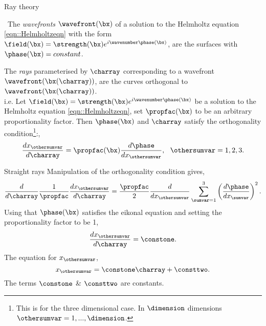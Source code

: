 \documentclass[8pt]{beamer}
\begin{document}
\begin{frame}{Ray theory}
\begin{minipage}{0.5\linewidth}
\begin{defn}[Wavefront]\label{defn::wavefront} \
The \textit{wavefronts $\wavefront(\bx)$} of a solution to the Helmholtz equation \eqref{eqn::Helmholtzeqn} with the form $\field (\bx) = \strength (\bx) e^{i \wavenumber \phase (\bx) }$, are the surfaces with 
$\phase(\bx)=constant$.
\end{defn}
\end{minipage}
\begin{minipage}{0.05\linewidth}
\mbox{}
\end{minipage}
\begin{minipage}{0.4\linewidth}
\begin{block}{} \wavefrontdiagram \vspace{-1cm} \end{block}
\end{minipage}
\begin{defn}[Ray]\label{defn::ray}
The \textit{rays} parameterised by $\charray$ corresponding to a wavefront $\wavefront(\bx(\charray))$, are the curves orthogonal to $\wavefront(\bx(\charray))$. \\ i.e. Let $\field (\bx) = \strength (\bx) e^{i \wavenumber \phase (\bx) }$ be a solution to the Helmholtz equation \eqref{eqn::Helmholtzeqn}, set $\propfac (\bx)$ to be an arbitrary proportionality factor. Then $\phase(\bx)$ and $\charray$ satisfy the orthogonality condition\footnote{This is for the three dimensional case. In $\dimension$ dimensions $\othersumvar=1,...,\dimension$.}:,
\begin{equation}
\label{eqn::rayorthogcond}
\frac{d x_\othersumvar}{d \charray}=\propfac (\bx) \frac{d \phase}{d x_\othersumvar}, \ \ \othersumvar=1,2,3. 
\end{equation}
\end{defn}
\end{frame}
\begin{frame}
\begin{block}{Straight rays}
Manipulation of the orthogonality condition gives,
\begin{equation}
\frac{d}{d \charray}\frac{1}{\propfac}\frac{d x_\othersumvar}{d \charray}= \frac{\propfac}{2} \frac{d}{d x_\othersumvar} \sum_{\sumvar=1}^3  \left(\frac{d \phase}{d x_\sumvar} \right)^2 .
\label{eqn::dsdxjsq}
\end{equation}
Using that $\phase(\bx)$ satisfies the eikonal equation and setting the proportionality factor to be 1,
\begin{equation}
\frac{d x_\othersumvar}{d \charray}= \constone.
\end{equation}
The equation for $x_\othersumvar$,
\begin{equation}
 x_\othersumvar= \constone\charray +\consttwo.
\end{equation}
The terms $\constone$ \& $\consttwo$ are constants. 
\end{block}
\end{frame}
\end{document}
